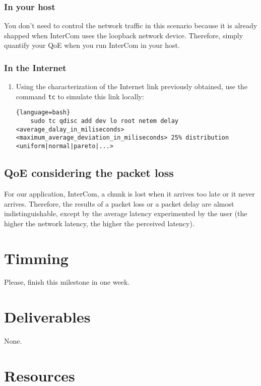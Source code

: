 \subsubsection{In your host}

You don't need to control the network traffic in this scenario because
it is already shapped when InterCom uses the loopback network
device. Therefore, simply quantify your QoE when you run InterCom in
your host.

\subsubsection{In the Internet}

\begin{enumerate}
  
\item Using the characterization of the Internet link previously
  obtained, use the command \texttt{tc} to simulate this link locally:

  \begin{lstlisting}{language=bash}
    sudo tc qdisc add dev lo root netem delay <average_dalay_in_miliseconds> <maximum_average_deviation_in_miliseconds> 25% distribution <uniform|normal|pareto|...>
  \end{lstlisting}  

\end{enumerate}

\subsection{QoE considering the packet loss}

For our application, InterCom, a chunk is lost when it arrives too
late or it never arrives. Therefore, the results of a packet loss or a
packet delay are almost indistinguishable, except by the average
latency experimented by the user (the higher the network latency, the
higher the perceived latency).



\section{Timming}

Please, finish this milestone in one week.

\section{Deliverables}

None.

\section{Resources}


